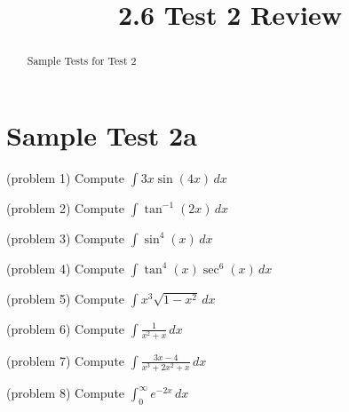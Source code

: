 \documentclass[handout]{ximera}
\title{2.6 Test 2 Review}
\begin{document}
\begin{abstract}
Sample Tests for Test 2
\end{abstract}

\maketitle

\section{Sample Test 2a}





\begin{problem}(problem 1)
Compute $\displaystyle \int 3x\sin(4x) \, dx$

\end{problem}


\begin{problem}(problem 2)
Compute $\displaystyle \int \tan^{-1}(2x) \, dx$

\end{problem}

\begin{problem}(problem 3)
Compute $\displaystyle \int \sin^4(x) \, dx$

\end{problem}

\begin{problem}(problem 4)
Compute $\displaystyle \int \tan^4(x) \sec^6(x) \, dx$

\end{problem}

\begin{problem}(problem 5)
Compute $\displaystyle \int x^3 \sqrt{1-x^2} \, dx$

\end{problem}

\begin{problem}(problem 6)
Compute $\displaystyle \int \frac{1}{x^2 + x} \, dx$

\end{problem}

\begin{problem}(problem 7)
Compute $\displaystyle \int \frac{3x-4}{x^3 +2x^2 +x} \, dx$

\end{problem}

\begin{problem}(problem 8)
Compute $\displaystyle \int_0^\infty e^{-2x} \, dx$

\end{problem}
\end{document}
